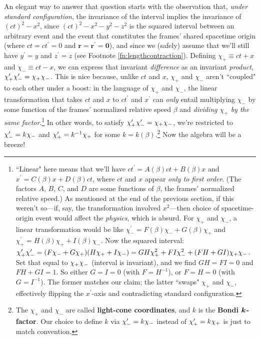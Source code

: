 \documentclass[12pt]{article}
\renewcommand{\vv}[1]{\mathbf{#1}}
\begin{document}
An elegant way to answer that question starts with the observation that, \emph{under standard configuration}, the invariance of the interval implies the invariance of $(ct)^2 - x^2$, since $(ct)^2 - x^2 - y^2 - z^2$ is the squared interval between an arbitrary event and the event that constitutes the frames' shared spacetime origin (where $ct = ct^{\prime} = 0$ and $\vv r = \vv r ^{\prime} = \vv 0$), and since we (safely) assume that we'll still have $y^{\prime} = y$ and $z^{\prime} = z$ (see Footnote \ref{fn:lengthcontraction}). Defining $\chi_+ \equiv ct + x$ and $\chi_- \equiv ct - x$, we can express that invariant \emph{difference} as an invariant \emph{product}, $\chi_+^{\prime} \mkern.5mu \chi_-^{\prime} = \chi_+ \mkern.5mu \chi_-$. This is nice because, unlike $ct$ and $x$, $\chi_+$ and $\chi_-$ aren't ``coupled" to each other under a boost: in the language of $\chi_+$ and $\chi_-$, the linear transformation that takes $ct$ and $x$ to $ct^{\prime}$ and $x^{\prime}$ can \emph{only} entail multiplying $\chi_-$ by some function of the frames' normalized relative speed $\beta$ and \emph{dividing $\chi_+$ by the same factor}.\footnote{``Linear" here means that we'll have $ct^{\prime} = A(\beta) ct + B(\beta) x$ and $x^{\prime} = C(\beta) x + D(\beta) ct$, where $ct$ and $x$ appear \emph{only to first order}. (The factors $A$, $B$, $C$, and $D$ are some functions of $\beta$, the frames' normalized relative speed.) As mentioned at the end of the previous section, if this weren't so---if, say, the transformation involved $x^2$---then choice of spacetime-origin event would affect the \emph{physics}, which is absurd. For $\chi_+$ and $\chi_-$, a linear transformation would be like $\chi_-^{\prime} = F(\beta) \chi_- + G(\beta) \chi_+$ and $\chi_+^{\prime} = H(\beta) \chi_+ + I(\beta) \chi_-$. Now the squared interval: $\chi_+^{\prime} \mkern.5mu \chi_-^{\prime} = (F \chi_- + G \chi_+)(H \chi_+ + I \chi_-) = GH\chi_+^2 + FI\chi_-^2 + (FH + GI)\chi_+\chi_-$. Set that equal to $\chi_+ \mkern.5mu \chi_-$ (interval is invariant), and we find $GH = FI = 0$ and $FH + GI = 1$. So either $G = I = 0$ (with $F = H^{-1}$), or $F = H = 0$ (with $G = I^{-1}$). The former matches our claim; the latter ``swaps" $\chi_+$ and $\chi_-$, effectively flipping the $x^{\prime}$-axis and contradicting standard configuration.} In other words, to satisfy $\chi_+^{\prime} \mkern.5mu \chi_-^{\prime} = \chi_+ \mkern.5mu \chi_-$, we're restricted to ${\chi_-^{\prime} = k \mkern.5mu \chi_-}$ and ${\chi_+^{\prime} = k^{-1} \mkern.5mu \chi_+}$ for some $k = k(\beta)$.\footnote{\label{fn:lcc}The $\chi_+$ and $\chi_-$ are called \textbf{light-cone coordinates}, and $k$ is the \textbf{Bondi $\bm{k} \mkern.5mu$-factor}. Our choice to define $k$ via ${\chi_-^{\prime} = k \mkern.5mu \chi_-}$ instead of ${\chi_+^{\prime} = k \mkern.5mu \chi_+}$ is just to match convention.} Now the algebra will be a breeze!
\end{document}
